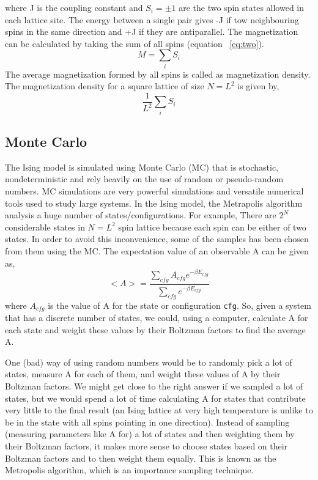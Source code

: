 \documentclass[]{article}
\begin{document}
where J is the coupling constant and $S_i = \pm 1$ are the two spin states allowed in each lattice site. The energy between a single pair gives -J if tow neighbouring spins in the same direction and +J if they are antiparallel. The magnetization can be calculated by taking the sum of all spins (equation ~\ref{eq:two}). 
\begin{equation}
\label{eq:two}
M = \sum_{i}S_i
\end{equation}
The average magnetization formed by all spins is called as magnetization density. The magnetization density for a square lattice of size $N = L^2$ is given by,  
\begin{equation}
\label{eq:three}
\frac{1}{L^2} \sum_{i}S_i
\end{equation}


\subsection{\label{sec:level2.2} Monte Carlo}
The Ising model is simulated using Monte Carlo (MC) that is stochastic, nondeterministic and rely heavily on the use of random or pseudo-random numbers. MC simulations are very powerful simulations and versatile numerical tools used to study large systems. In the Ising model, the Metrapolis algorithm analysis a huge number of states/configurations. For example, There are $2^N$ considerable states in $N = L^2$ spin lattice because each spin can be either of two states. In order to avoid this inconvenience, some of the samples has been chosen from them using the MC.
The expectation value of an observable A can be given as,
\begin{equation}
\label{eq:four}
<A> = \frac{\sum_{cfg}{A_{cfg}e^{-\beta E_{cfg}}}}{\sum_{cfg}{e^{-\beta E_{cfg}}}}
\end{equation}
where $A_{cfg}$ is the value of A for the state or configuration \texttt{cfg}. So, given a system that has a discrete number of states, we could, using a computer, calculate A for each state and weight these values by their Boltzman factors to find the average A.

 One (bad) way of using random numbers would be to randomly pick a lot of states, measure A for each of them, and weight these values of A by their Boltzman factors. We might get close to the right answer if we sampled a lot of states, but we would spend a lot of time calculating A for states that contribute very little to the final result (an Ising lattice at very high temperature is unlike to be in the state with all spins pointing in one direction). Instead of sampling (measuring parameters like A for) a lot of states and then weighting them by their Boltzman factors, it makes more sense to choose states based on their Boltzman factors and to then weight them equally. This is known as the Metropolis algorithm, which is an importance sampling technique.
 
\end{document}
